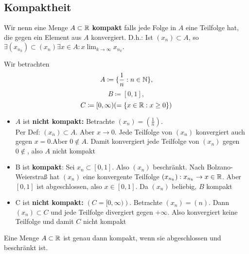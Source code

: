 \subsection{Kompaktheit}
\begin{subdefinition}
	Wir nenn eine Menge $ A \subset \mathbb{R} $ \textbf{kompakt} falls jede Folge in $ A $ eine Teilfolge hat, die gegen ein Element aus $ A $ konvergiert. D.h.: Ist $ (x_n) \subset A $, so $ \exists (x_{n_k}) \subset  (x_n) \exists x \in A: x \lim_{k \to \infty} x_{n_k}$.
\end{subdefinition}

\begin{subexample}
	Wir betrachten
	\[
		A \coloneqq \{\frac{1}{n}: n \in \mathbb{N}\} ,
	\]
	\[
		B \coloneqq [0, 1], 
	\]
	\[
		C \coloneqq [0, \infty) ( = \{x \in \mathbb{R}: x \geq 0\} )
	\]
	\begin{itemize}
		\item $ A $ ist \textbf{nicht kompakt:} Betrachte $ (x_n) = (\frac{1}{n}) $.\\
			Per Def: $ (x_n) \subset A $. Aber $ x \to 0 $. Jede Teilfolge von $ (x_n) $ konvergiert auch gegen $ x = 0 $.Aber $ 0 \not\in A $. Damit konvergiert jede Teilfolge von $ (x_n) $ gegen $ 0 \not\in $, also $ A $ nicht kompakt
		\item B ist \textbf{kompakt}: Sei $ x_n \subset [0, 1] $. Also $ (x_n) $ beschränkt. Nach Bolzano-Weierstraß hat $ (x_n) $ eine konvergente Teilfolge $ (x_{n_k}) : x_{n_k} \to x \in  \mathbb{R} $. Aber $  [0, 1] $ ist abgeschlossen, also $  x \in [0, 1] $. Da $ (x_n) $ beliebig, $ B $ kompakt
		\item C ist \textbf{nicht kompakt:} $ \left( C = [0, \infty) \right) $. Betrachte $  (x_n) = (n) $. Dann $ (x_n) \subset C $ und jede Teilfolge divergiert gegen $ +\infty $. Also konvergiert keine Teilfolge und damit $ C $ nicht kompakt
	\end{itemize}
\end{subexample}
\begin{subtheorem}
	Eine Menge $ A \subset \mathbb{R} $ ist genau dann kompakt, wenn sie abgeschlossen und beschränkt ist.
\end{subtheorem}

